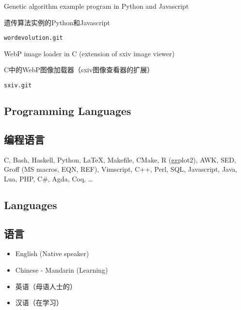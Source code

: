 \begin{itemize}
\begin{xen}
            \item Genetic algorithm example program in Python and Javascript
\end{xen}
\begin{xcn}
            \item 遗传算法实例的Python和Javascript
\end{xcn}
                \hfill
                \texttt{wordevolution.git}
\begin{xen}
            \item WebP image loader in C (extension of sxiv image viewer)
\end{xen}
\begin{xcn}
            \item C中的WebP图像加载器（sxiv图像查看器的扩展）
\end{xcn}
                \hfill
                \texttt{sxiv.git}
        \end{itemize}
\begin{xen}
\section{Programming Languages}
\end{xen}
\begin{xcn}
\section{编程语言}
\end{xcn}
    C,
    Bash,
    Haskell,
    Python,
    \LaTeX,
    Makefile,
    CMake,
    R (ggplot2),
    AWK,
    SED,
    Groff (MS macros, EQN, REF),
    Vimscript,
    C++,
    Perl,
    SQL,
    Javascript,
    Java,
    Lua,
    PHP,
    C\#,
    Agda,
    Coq,
    \ldots
\begin{xen}
\section{Languages}
\end{xen}
\begin{xcn}
\section{语言}
\end{xcn}
\begin{xen}
    \begin{itemize}
        \item English (Native speaker)
        \item Chinese - Mandarin (Learning)
    \end{itemize}
\end{xen}
\begin{xcn}
    \begin{itemize}
        \item 英语（母语人士的）
        \item 汉语（在学习）
    \end{itemize}
\end{xcn}
